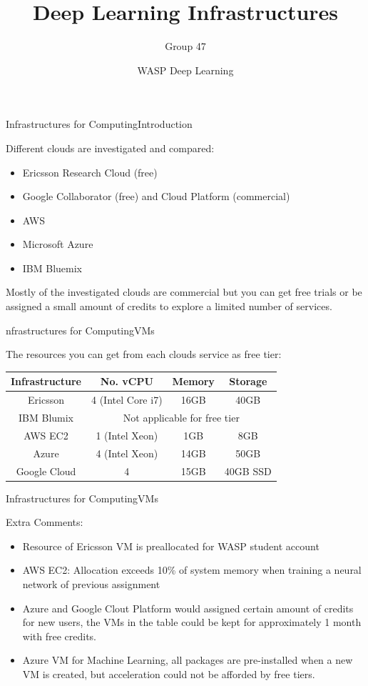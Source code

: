 \documentclass{beamer}
\title{Deep Learning Infrastructures}
\date{WASP Deep Learning}
\author[Agents 47]{Group 47}
\begin{document}
\begin{frame}
  \titlepage
\end{frame}


\begin{frame}{Infrastructures for Computing}{Introduction}

Different clouds are investigated and compared:
\begin{itemize}
	\item Ericsson Research Cloud (free)
	\item Google Collaborator (free) and Cloud Platform (commercial)
	\item AWS
	\item Microsoft Azure
	\item IBM Bluemix 
\end{itemize}
Mostly of the investigated clouds are commercial  but you can get free trials or be assigned a small amount of credits to explore a limited number of services.   
\end{frame}

\begin{frame}{nfrastructures for Computing}{VMs }

The resources you can get from each clouds service as free tier:
\begin{table}[H]
	\begin{tabular}{|c|c|c|c|}
		\hline
		Infrastructure & No. vCPU&Memory&Storage\\
		\hline
		Ericsson & 4 (Intel Core i7) & 16GB & 40GB\\
		\hline
		IBM Blumix & \multicolumn{3}{c|}{Not applicable for free tier } \\
		\hline
		AWS EC2 & 1 (Intel Xeon)& 1GB& 8GB\\
		\hline
		Azure& 4 (Intel Xeon)& 14GB & 50GB \\
		\hline
		Google Cloud& 4 & 15GB & 40GB SSD\\
		\hline
	\end{tabular}
\end{table}


\end{frame}

\begin{frame}{Infrastructures for Computing}{VMs}

Extra Comments:
\begin{itemize}
	\item Resource of Ericsson VM is preallocated for WASP student account
	\item AWS EC2: Allocation exceeds 10\% of system memory when training a neural network of previous assignment 
	\item Azure and Google Clout Platform would assigned certain amount of credits for new users, the VMs in the table could be kept for approximately 1 month with free credits.
	\item Azure VM for Machine Learning, all packages are pre-installed when a new VM is created, but acceleration could not be afforded by free tiers. 
\end{itemize}

\end{frame}
\end{document}
